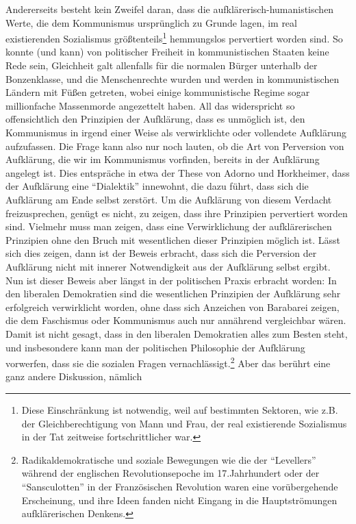 \documentclass[12pt,a4paper,ngerman]{article}
\begin{document}
Ander\-erseits besteht kein Zweifel daran, dass die
auf\-klär\-er\-isch\--\-human\-ist\-isch\-en Werte, die dem
Kommunismus ursprünglich zu Grunde lagen, im real existierenden
Sozialismus größtenteils\footnote{Diese Einschränkung ist notwendig,
  weil auf bestimmten Sektoren, wie z.B. der Gleichberechtigung von
  Mann und Frau, der real existierende Sozialismus in der Tat
  zeitweise fortschrittlicher war.}  hemmungslos pervertiert worden
sind. So konnte (und kann) von politischer Freiheit in kommunistischen
Staaten keine Rede sein, Gleichheit galt allenfalls für die normalen
Bürger unterhalb der Bonzenklasse, und die Menschenrechte wurden und
werden in kommunistischen Ländern mit Füßen getreten, wobei einige
kommunistische Regime sogar millionfache Massenmorde angezettelt
haben. All das widerspricht so offensichtlich den Prinzipien der
Aufklärung, dass es unmöglich ist, den Kommunismus in irgend einer
Weise als verwirklichte oder vollendete Aufklärung aufzufassen. Die
Frage kann also nur noch lauten, ob die Art von Perversion von
Aufklärung, die wir im Kommunismus vorfinden, bereits in der
Aufklärung angelegt ist. Dies entspräche in etwa der These von Adorno
und Horkheimer, dass der Aufklärung eine "`Dialektik"' innewohnt, die
dazu führt, dass sich die Aufklärung am Ende selbst zerstört.  Um die
Aufklärung von diesem Verdacht freizusprechen, genügt es nicht, zu
zeigen, dass ihre Prinzipien pervertiert worden sind. Vielmehr muss
man zeigen, dass eine Verwirklichung der aufklärerischen Prinzipien
ohne den Bruch mit wesentlichen dieser Prinzipien möglich ist. Lässt
sich dies zeigen, dann ist der Beweis erbracht, dass sich die
Perversion der Aufklärung nicht mit innerer Notwendigkeit aus der
Aufklärung selbst ergibt. Nun ist dieser Beweis aber längst in der
politischen Praxis erbracht worden: In den liberalen Demokratien sind
die wesentlichen Prinzipien der Aufklärung sehr erfolgreich
verwirklicht worden, ohne dass sich Anzeichen von Barabarei zeigen,
die dem Faschismus oder Kommunismus auch nur annährend vergleichbar
wären. Damit ist nicht gesagt, dass in den liberalen Demokratien alles
zum Besten steht, und insbesondere kann man der politischen
Philosophie der Aufklärung vorwerfen, dass sie die sozialen Fragen
vernachlässigt.\footnote{Radikaldemokratische und soziale Bewegungen
  wie die der "`Levellers"' während der englischen Revolutionsepoche
  im 17.Jahrhundert oder der "`Sansculotten"' in der Französischen
  Revolution waren eine vorübergehende Erscheinung, und ihre Ideen
  fanden nicht Eingang in die Hauptströmungen aufklärerischen
  Denkens.}  Aber das berührt eine ganz andere Diskussion, nämlich
\end{document}
